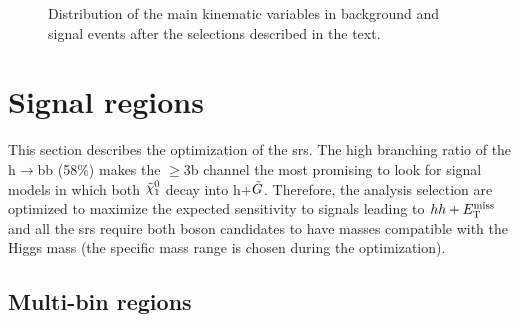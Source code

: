 \begin{figure}[htbp]
\caption{Distribution of  the main kinematic variables in background and signal events after the selections described in the text.}
\label{fig:ewk:sig:1}
\end{figure}

\FloatBarrier

\section{Signal regions}

This section describes the optimization of the \glspl{sr}. 
The high branching ratio of the h$\rightarrow$bb (58\%) makes the $\geq$3b channel the most promising to look for signal models 
in which both $\ninoone$ decay into h+$\tilde{G}$. 
Therefore, the analysis selection are optimized to maximize the expected sensitivity to signals leading to $hh+E_{\rm T}^{\mathrm{miss}}$ 
and all the \glspl{sr} require both boson candidates to have masses compatible with the Higgs mass (the specific mass range is chosen during the optimization). 

\subsection{Multi-bin regions}
\label{sec:ewk:multibin}

